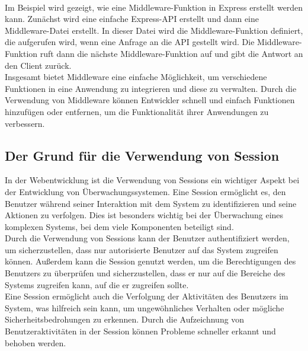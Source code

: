 \\
Im Beispiel wird gezeigt, wie eine Middleware-Funktion in Express erstellt werden kann. Zunächst wird eine einfache Express-\acs{API} erstellt und dann eine Middleware-Datei erstellt. In dieser Datei wird die Middleware-Funktion definiert, die aufgerufen wird, wenn eine Anfrage an die \acs{API} gestellt wird. Die Middleware-Funktion ruft dann die nächste Middleware-Funktion auf und gibt die Antwort an den Client zurück.
\\
Insgesamt bietet Middleware eine einfache Möglichkeit, um verschiedene Funktionen in eine Anwendung zu integrieren und diese zu verwalten. Durch die Verwendung von Middleware können Entwickler schnell und einfach Funktionen hinzufügen oder entfernen, um die Funktionalität ihrer Anwendungen zu verbessern.

\subsection{Der Grund für die Verwendung von Session}\label{appendix:a6}\par
In der Webentwicklung ist die Verwendung von Sessions ein wichtiger Aspekt bei der Entwicklung von Überwachungssystemen. Eine Session ermöglicht es, den Benutzer während seiner Interaktion mit dem System zu identifizieren und seine Aktionen zu verfolgen. Dies ist besonders wichtig bei der Überwachung eines komplexen Systems, bei dem viele Komponenten beteiligt sind.
\\
Durch die Verwendung von Sessions kann der Benutzer authentifiziert werden, um sicherzustellen, dass nur autorisierte Benutzer auf das System zugreifen können. Außerdem kann die Session genutzt werden, um die Berechtigungen des Benutzers zu überprüfen und sicherzustellen, dass er nur auf die Bereiche des Systems zugreifen kann, auf die er zugreifen sollte.
\\
Eine Session ermöglicht auch die Verfolgung der Aktivitäten des Benutzers im System, was hilfreich sein kann, um ungewöhnliches Verhalten oder mögliche Sicherheitsbedrohungen zu erkennen. Durch die Aufzeichnung von Benutzeraktivitäten in der Session können Probleme schneller erkannt und behoben werden.

